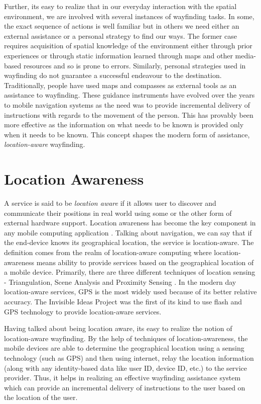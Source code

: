 \documentclass{iitkthesis}
\begin{document}
Further, its easy to realize that in our everyday interaction with the spatial environment, we are involved with several instances of wayfinding tasks. In some, the exact sequence of actions is well familiar but in others we need either an external assistance or a personal strategy to find our ways. The former case requires acquisition of spatial knowledge of the environment either through prior experiences or through static information learned through maps and other media-based resources and so is prone to errors. Similarly, personal strategies used in wayfinding do not guarantee a successful endeavour to the destination. Traditionally, people have used maps and compasses as external tools as an assistance to wayfinding. These guidance instruments have evolved over the years to mobile navigation systems as the need was to provide incremental delivery of instructions with regards to the movement of the person. This has provably been more effective as the information on what needs to be known is provided only when it needs to be known. This concept shapes the modern form of assistance, \textit{location-aware} wayfinding. 
\section{Location Awareness}
A service is said to be \textit{location aware} if it allows user to discover and communicate their positions in real world using some or the other form of external hardware support. Location awareness has become the key component in any mobile computing application \cite{parctab}. Talking about navigation, we can say that if the end-device knows its geographical location, the service is location-aware. The definition comes from the realm of location-aware computing where location-awareness means ability to provide services based on the geographical location of a mobile device. Primarily, there are three different techniques of location sensing - Triangulation, Scene Analysis and Proximity Sensing \cite{hightower}. In the modern day location-aware services, GPS is the most widely used because of its better relative accuracy. The Invisible Ideas Project \cite{perry} was the first of its kind to use flash and GPS technology to provide location-aware services.

Having talked about being location aware, its easy to realize the notion of location-aware wayfinding. By the help of techniques of location-awareness, the mobile devices are able to determine the geographical location using a sensing technology (such as GPS) and then using internet, relay the location information (along with any identity-based data like user ID, device ID, etc.) to the service provider. Thus, it helps in realizing an effective wayfinding assistance system which can provide an incremental delivery of instructions to the user based on the location of the user. 
\end{document}
